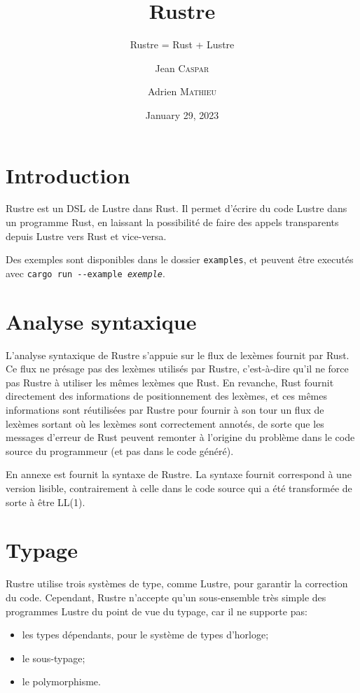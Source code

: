 \documentclass{scrartcl}
\title{Rustre}
\subtitle{Rustre = Rust + Lustre}
\author{Jean \textsc{Caspar} \and Adrien \textsc{Mathieu}}
\date{January 29, 2023}
\begin{document}
\maketitle{}
\tableofcontents
\pagebreak

\section*{Introduction}
Rustre est un DSL de Lustre dans Rust. Il permet d'écrire du code Lustre dans un programme Rust,
en laissant la possibilité de faire des appels transparents depuis Lustre vers Rust et
vice-versa.

Des exemples sont disponibles dans le dossier \texttt{examples}, et peuvent être executés avec
\texttt{cargo run -{}-example \textit{exemple}}.

\section{Analyse syntaxique}
L'analyse syntaxique de Rustre s'appuie sur le flux de lexèmes fournit par Rust. Ce flux ne
présage pas des lexèmes utilisés par Rustre, c'est-à-dire qu'il ne force pas Rustre à utiliser
les mêmes lexèmes que Rust. En revanche, Rust fournit directement des informations de
positionnement des lexèmes, et ces mêmes informations sont réutilisées par Rustre pour fournir à
son tour un flux de lexèmes sortant où les lexèmes sont correctement annotés, de sorte que les
messages d'erreur de Rust peuvent remonter à l'origine du problème dans le code source du
programmeur (et pas dans le code généré).

En annexe est fournit la syntaxe de Rustre. La syntaxe fournit correspond à une version lisible,
contrairement à celle dans le code source qui a été transformée de sorte à être LL(1).

\section{Typage}
Rustre utilise trois systèmes de type, comme Lustre, pour garantir la correction du code.
Cependant, Rustre n'accepte qu'un sous-ensemble très simple des programmes Lustre du point de vue
du typage, car il ne supporte pas:
\begin{itemize}
\item les types dépendants, pour le système de types d'horloge;
\item le sous-typage;
\item le polymorphisme.
\end{itemize}
\end{document}
